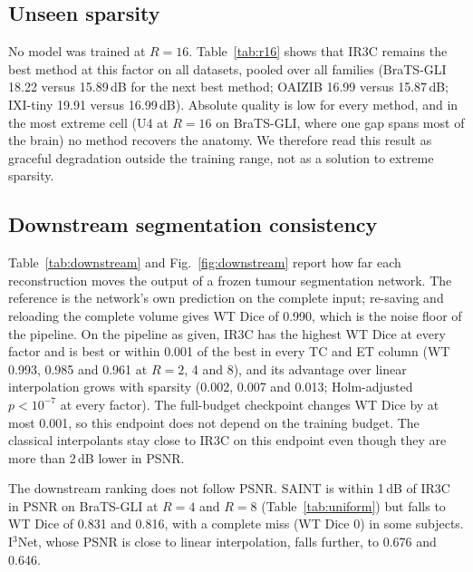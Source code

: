 \documentclass[a4paper,fleqn]{cas-dc}
\newcommand{\Ithree}{I$^3$Net\xspace}
\begin{document}
\subsection{Unseen sparsity}
\label{sec:res-r16}

No model was trained at $R=16$. Table~\ref{tab:r16} shows that IR3C remains the best method at
this factor on all datasets, pooled over all families (BraTS-GLI 18.22 versus 15.89\,dB for the
next best method; OAIZIB 16.99 versus 15.87\,dB; IXI-tiny 19.91 versus 16.99\,dB). Absolute
quality is low for every method, and in the most extreme cell (U4 at $R=16$ on BraTS-GLI,
where one gap spans most of the brain) no method recovers the anatomy. We therefore read this
result as graceful degradation outside the training range, not as a solution to extreme
sparsity.



\subsection{Downstream segmentation consistency}
\label{sec:res-downstream}

Table~\ref{tab:downstream} and Fig.~\ref{fig:downstream} report how far each reconstruction
moves the output of a frozen tumour segmentation network. The reference is the network's own
prediction on the complete input; re-saving and reloading the complete volume gives WT Dice
of 0.990, which is the noise floor of the pipeline. On the pipeline as given, IR3C has the highest WT Dice at every factor and is best or within 0.001 of the best in every TC and ET column (WT 0.993, 0.985 and 0.961 at $R=2$, 4 and 8), and its advantage over linear
interpolation grows with sparsity (0.002, 0.007 and 0.013; Holm-adjusted $p<10^{-7}$ at every factor). The full-budget checkpoint changes WT Dice by at most 0.001, so this endpoint does not depend on the training budget. The classical interpolants stay close to IR3C on this endpoint even though they are
more than 2\,dB lower in PSNR.

The downstream ranking does not follow PSNR. SAINT is within 1\,dB of IR3C in PSNR on BraTS-GLI at
$R=4$ and $R=8$ (Table~\ref{tab:uniform}) but falls to WT Dice of 0.831 and 0.816, with a
complete miss (WT Dice 0) in some subjects. \Ithree, whose PSNR is close to linear
interpolation, falls further, to 0.676 and 0.646.
\end{document}
